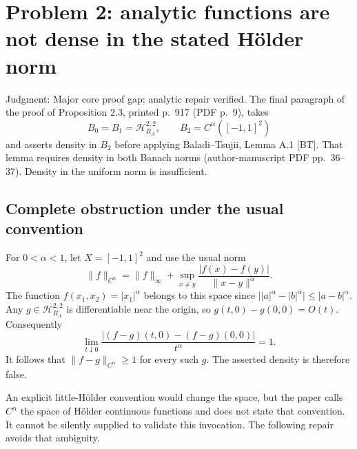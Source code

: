 \documentclass[10pt]{article}
\begin{document}
\section*{Problem 2: analytic functions are not dense in the stated Hölder norm}
Judgment: Major core proof gap; analytic repair verified. The final paragraph of the proof of Proposition 2.3, printed p. 917 (PDF p. 9), takes \[B_0=B_1=\mathcal H^{2,2}_{R_A},\qquad B_2=C^\alpha([-1,1]^2)\] and asserts density in \(B_2\) before applying Baladi–Tsujii, Lemma A.1 [BT]. That lemma requires density in both Banach norms (author-manuscript PDF pp. 36–37). Density in the uniform norm is insufficient.\par
\subsection*{Complete obstruction under the usual convention}
For \(0<\alpha<1\), let \(X=[-1,1]^2\) and use the usual norm \[\|f\|_{C^\alpha}=\|f\|_\infty+
 \sup_{x\ne y}\frac{|f(x)-f(y)|}{\|x-y\|^\alpha}.\] The function \(f(x_1,x_2)=|x_1|^\alpha\) belongs to this space since \(\big||a|^\alpha-|b|^\alpha\big|\le|a-b|^\alpha\). Any \(g\in\mathcal H^{2,2}_{R_A}\) is differentiable near the origin, so \(g(t,0)-g(0,0)=O(t)\). Consequently \[\lim_{t\downarrow0}
 \frac{|(f-g)(t,0)-(f-g)(0,0)|}{t^\alpha}=1.\] It follows that \(\|f-g\|_{C^\alpha}\ge1\) for every such \(g\). The asserted density is therefore false.\par
An explicit little-Hölder convention would change the space, but the paper calls \(C^\alpha\) the space of Hölder continuous functions and does not state that convention. It cannot be silently supplied to validate this invocation. The following repair avoids that ambiguity.\par
\end{document}
